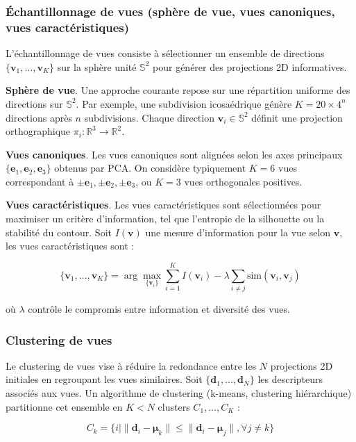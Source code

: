 \documentclass[11pt,a4paper,oneside]{report}
\begin{document}
\subsubsection{Échantillonnage de vues (sphère de vue, vues canoniques, vues caractéristiques)}

L'échantillonnage de vues consiste à sélectionner un ensemble de directions $\{\mathbf{v}_1, \ldots, \mathbf{v}_K\}$ sur la sphère unité $\mathbb{S}^2$ pour générer des projections 2D informatives. 

\textbf{Sphère de vue}. Une approche courante repose sur une répartition uniforme des directions sur $\mathbb{S}^2$. Par exemple, une subdivision icosaédrique génère $K = 20 \times 4^n$ directions après $n$ subdivisions. Chaque direction $\mathbf{v}_i \in \mathbb{S}^2$ définit une projection orthographique $\pi_i : \mathbb{R}^3 \to \mathbb{R}^2$.

\textbf{Vues canoniques}. Les vues canoniques sont alignées selon les axes principaux $\{\mathbf{e}_1, \mathbf{e}_2, \mathbf{e}_3\}$ obtenus par PCA. On considère typiquement $K = 6$ vues correspondant à $\pm\mathbf{e}_1, \pm\mathbf{e}_2, \pm\mathbf{e}_3$, ou $K = 3$ vues orthogonales positives.

\textbf{Vues caractéristiques}. Les vues caractéristiques sont sélectionnées pour maximiser un critère d'information, tel que l'entropie de la silhouette ou la stabilité du contour. Soit $I(\mathbf{v})$ une mesure d'information pour la vue selon $\mathbf{v}$, les vues caractéristiques sont :

$$\{\mathbf{v}_1, \ldots, \mathbf{v}_K\} = \arg\max_{\{\mathbf{v}_i\}} \sum_{i=1}^K I(\mathbf{v}_i) - \lambda \sum_{i \neq j} \text{sim}(\mathbf{v}_i, \mathbf{v}_j)$$

où $\lambda$ contrôle le compromis entre information et diversité des vues.

\subsubsection{Clustering de vues}

Le clustering de vues vise à réduire la redondance entre les $N$ projections 2D initiales en regroupant les vues similaires. Soit $\{\mathbf{d}_1, \ldots, \mathbf{d}_N\}$ les descripteurs associés aux vues. Un algorithme de clustering (k-means, clustering hiérarchique) partitionne cet ensemble en $K < N$ clusters $C_1, \ldots, C_K$ :

$$C_k = \{i \mid \|\mathbf{d}_i - \boldsymbol{\mu}_k\| \leq \|\mathbf{d}_i - \boldsymbol{\mu}_j\|, \forall j \neq k\}$$
\end{document}
